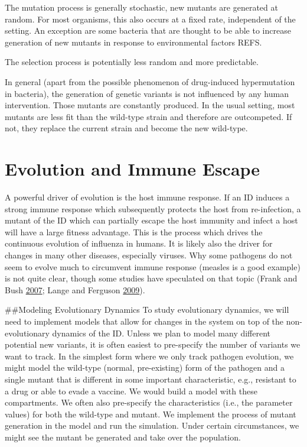 \documentclass[]{book}
\theoremstyle{definition}
\theoremstyle{definition}
\theoremstyle{definition}
\theoremstyle{remark}
\begin{document}
The mutation process is generally stochastic, new mutants are generated
at random. For most organisms, this also occurs at a fixed rate,
independent of the setting. An exception are some bacteria that are
thought to be able to increase generation of new mutants in response to
environmental factors REFS.

The selection process is potentially less random and more predictable.

In general (apart from the possible phenomenon of drug-induced
hypermutation in bacteria), the generation of genetic variants is not
influenced by any human intervention. Those mutants are constantly
produced. In the usual setting, most mutants are less fit than the
wild-type strain and therefore are outcompeted. If not, they replace the
current strain and become the new wild-type.

\hypertarget{evolution-and-immune-escape}{%
\section{Evolution and Immune
Escape}\label{evolution-and-immune-escape}}

A powerful driver of evolution is the host immune response. If an ID
induces a strong immune response which subsequently protects the host
from re-infection, a mutant of the ID which can partially escape the
host immunity and infect a host will have a large fitness advantage.
This is the process which drives the continuous evolution of influenza
in humans. It is likely also the driver for changes in many other
diseases, especially viruses. Why some pathogens do not seem to evolve
much to circumvent immune response (measles is a good example) is not
quite clear, though some studies have speculated on that topic (Frank
and Bush \protect\hyperlink{ref-frank07}{2007}; Lange and Ferguson
\protect\hyperlink{ref-lange09}{2009}).

\#\#Modeling Evolutionary Dynamics To study evolutionary dynamics, we
will need to implement models that allow for changes in the system on
top of the non-evolutionary dynamics of the ID. Unless we plan to model
many different potential new variants, it is often easiest to
pre-specify the number of variants we want to track. In the simplest
form where we only track pathogen evolution, we might model the
wild-type (normal, pre-existing) form of the pathogen and a single
mutant that is different in some important characteristic, e.g.,
resistant to a drug or able to evade a vaccine. We would build a model
with these compartments. We often also pre-specify the characteristics
(i.e., the parameter values) for both the wild-type and mutant. We
implement the process of mutant generation in the model and run the
simulation. Under certain circumstances, we might see the mutant be
generated and take over the population.
\end{document}
